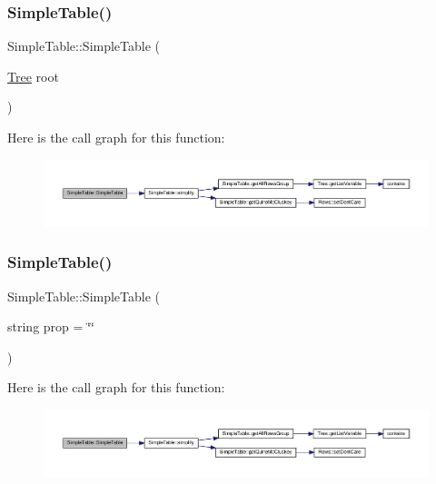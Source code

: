 \subsubsection{\texorpdfstring{Simple\+Table()}{SimpleTable()}\hspace{0.1cm}{\footnotesize\ttfamily [1/4]}}
{\footnotesize\ttfamily Simple\+Table\+::\+Simple\+Table (\begin{DoxyParamCaption}\item[{\hyperlink{class_tree}{Tree}}]{root }\end{DoxyParamCaption})\hspace{0.3cm}{\ttfamily [explicit]}}

Here is the call graph for this function\+:\nopagebreak
\begin{figure}[H]
\begin{center}
\leavevmode
\includegraphics[width=350pt]{d0/d52/class_simple_table_ae021726ae4be0f56813c3f1306c9097b_cgraph}
\end{center}
\end{figure}
\mbox{\label{class_simple_table_a368bd0b80e902560f9cc0e7695a7a5d2}} 
\subsubsection{\texorpdfstring{Simple\+Table()}{SimpleTable()}\hspace{0.1cm}{\footnotesize\ttfamily [2/4]}}
{\footnotesize\ttfamily Simple\+Table\+::\+Simple\+Table (\begin{DoxyParamCaption}\item[{string}]{prop = {\ttfamily \char`\"{}\char`\"{}} }\end{DoxyParamCaption})\hspace{0.3cm}{\ttfamily [explicit]}}

Here is the call graph for this function\+:\nopagebreak
\begin{figure}[H]
\begin{center}
\leavevmode
\includegraphics[width=350pt]{d0/d52/class_simple_table_a368bd0b80e902560f9cc0e7695a7a5d2_cgraph}
\end{center}
\end{figure}
\mbox{\label{class_simple_table_afcdfe80e8f2ed145c0baa2cb15722a22}} 
